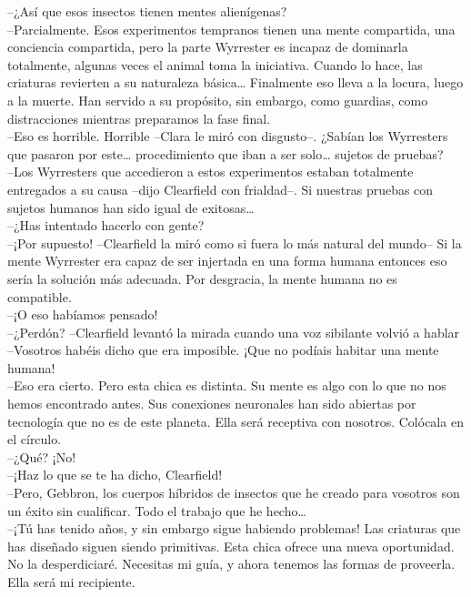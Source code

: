 --¿Así que esos insectos tienen mentes alienígenas?\\
--Parcialmente. Esos experimentos tempranos tienen una mente compartida,
una conciencia compartida, pero la parte Wyrrester es incapaz de
dominarla totalmente, algunas veces el animal toma la iniciativa. Cuando
lo hace, las criaturas revierten a su naturaleza básica\ldots{}
Finalmente eso lleva a la locura, luego a la muerte. Han servido a su
propósito, sin embargo, como guardias, como distracciones mientras
preparamos la fase final.\\
--Eso es horrible. Horrible --Clara le miró con disgusto--. ¿Sabían los
Wyrresters que pasaron por este\ldots{} procedimiento que iban a ser
solo\ldots{} sujetos de pruebas?\\
--Los Wyrresters que accedieron a estos experimentos estaban totalmente
entregados a su causa --dijo Clearfield con frialdad--. Si nuestras
pruebas con sujetos humanos han sido igual de exitosas\ldots{}\\
--¿Has intentado hacerlo con gente?\\
--¡Por supuesto! --Clearfield la miró como si fuera lo más natural del
mundo-- Si la mente Wyrrester era capaz de ser injertada en una forma
humana entonces eso sería la solución más adecuada. Por desgracia, la
mente humana no es compatible.\\
--¡O eso habíamos pensado!\\
--¿Perdón? --Clearfield levantó la mirada cuando una voz sibilante
volvió a hablar --Vosotros habéis dicho que era imposible. ¡Que no
podíais habitar una mente humana!\\
--Eso era cierto. Pero esta chica es distinta. Su mente es algo con lo
que no nos hemos encontrado antes. Sus conexiones neuronales han sido
abiertas por tecnología que no es de este planeta. Ella será receptiva
con nosotros. Colócala en el círculo.\\
--¿Qué? ¡No!\\
--¡Haz lo que se te ha dicho, Clearfield!\\
--Pero, Gebbron, los cuerpos híbridos de insectos que he creado para
vosotros son un éxito sin cualificar. Todo el trabajo que he
hecho\ldots{}\\
--¡Tú has tenido años, y sin embargo sigue habiendo problemas! Las
criaturas que has diseñado siguen siendo primitivas. Esta chica ofrece
una nueva oportunidad. No la desperdiciaré. Necesitas mi guía, y ahora
tenemos las formas de proveerla. Ella será mi recipiente.\\
